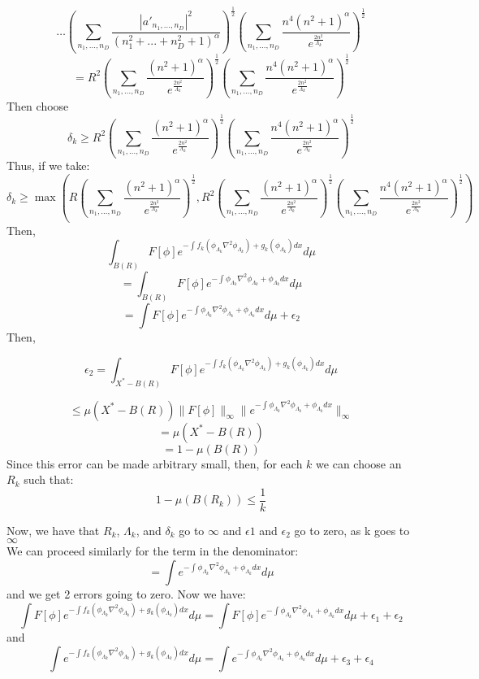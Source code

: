 \documentclass{article}
\theoremstyle{definition}
\begin{document}
\[
\ldots \left(\sum_{n_1,..., n_D} \frac{\left|{a'_{n_1,..., n_D}}\right|^2}{(n_1^2 +...+ n_D^2 + 1)^{\alpha}} \right)^{\frac{1}{2}} \left( \sum_{n_1,\ldots,n_D}\frac{n^4(n^2+1)^\alpha}{e^{\frac{2n^2}{\Lambda_k}}} \right)^{\frac{1}{2}}
\]
\[
=R^2 \left( \sum_{n_1,\ldots,n_D}\frac{(n^2+1)^\alpha}{e^{\frac{2n^2}{\Lambda_k}}} \right)^{\frac{1}{2}} \left( \sum_{n_1,\ldots,n_D}\frac{n^4(n^2+1)^\alpha}{e^{\frac{2n^2}{\Lambda_k}}} \right)^{\frac{1}{2}}
\]
Then choose
\[
\delta_k \geq R^2 \left( \sum_{n_1,\ldots,n_D}\frac{(n^2+1)^\alpha}{e^{\frac{2n^2}{\Lambda_k}}} \right)^{\frac{1}{2}} \left( \sum_{n_1,\ldots,n_D}\frac{n^4(n^2+1)^\alpha}{e^{\frac{2n^2}{\Lambda_k}}} \right)^{\frac{1}{2}}
\]
Thus, if we take:
\[
\delta_k \geq \max\left(R\left( \sum_{n_1,\ldots,n_D}\frac{(n^2+1)^\alpha}{e^{\frac{2n^2}{\Lambda_k}}} \right)^{\frac{1}{2}}, R^2 \left( \sum_{n_1,\ldots,n_D}\frac{(n^2+1)^\alpha}{e^{\frac{2n^2}{\Lambda_k}}} \right)^{\frac{1}{2}} \left( \sum_{n_1,\ldots,n_D}\frac{n^4(n^2+1)^\alpha}{e^{\frac{2n^2}{\Lambda_k}}} \right)^{\frac{1}{2}}\right)
\]
Then,
\[
\int_{B(R)} F[\phi]e^{-\int f_k\left(\phi_{\Lambda_k} \nabla^2 \phi_{\Lambda_k}\right) + g_k\left(\phi_{\Lambda_k}\right) dx}d\mu
\]
\[
=\int_{B(R)} F[\phi]e^{-\int \phi_{\Lambda_k} \nabla^2 \phi_{\Lambda_k} + \phi_{\Lambda_k} dx}d\mu
\]
\[
=\int F[\phi]e^{-\int \phi_{\Lambda_k} \nabla^2 \phi_{\Lambda_k} + \phi_{\Lambda_k} dx}d\mu + \epsilon_2
\]
Then,

\[
\epsilon_2 = \int_{X^*-B(R)} F[\phi]e^{-\int f_k\left(\phi_{\Lambda_k} \nabla^2 \phi_{\Lambda_k}\right) + g_k\left(\phi_{\Lambda_k}\right) dx}d\mu
\]

\[
\leq \mu(X^*-B(R)) \|F[\phi]\|_\infty \|e^{-\int \phi_{\Lambda_k} \nabla^2 \phi_{\Lambda_k} + \phi_{\Lambda_k} dx}\|_\infty
\]
\[
=\mu(X^*-B(R))
\]
\[
=1-\mu(B(R))
\]
Since this error can be made arbitrary small, then, for each $k$ we can choose an $R_k$ such that:
\[
1-\mu(B(R_k)) \leq \frac{1}{k}
\]

Now, we have that $R_k$, $\Lambda_k$, and $\delta_k$ go to $\infty$ and $\epsilon1$ and $\epsilon_2$ go to zero, as k goes to $\infty$\\
We can proceed similarly for the term in the denominator: 
\[
=\int e^{-\int \phi_{\Lambda_k} \nabla^2 \phi_{\Lambda_k} + \phi_{\Lambda_k} dx}d\mu
\]
and we get 2 errors going to zero. Now we have:
\[
\int F[\phi]e^{-\int f_k\left(\phi_{\Lambda_k} \nabla^2 \phi_{\Lambda_k}\right) + g_k\left(\phi_{\Lambda_k}\right) dx}d\mu =\int F[\phi]e^{-\int \phi_{\Lambda_k} \nabla^2 \phi_{\Lambda_k} + \phi_{\Lambda_k} dx}d\mu + \epsilon_1 +\epsilon_2
\]
and 
\[
\int e^{-\int f_k\left(\phi_{\Lambda_k} \nabla^2 \phi_{\Lambda_k}\right) + g_k\left(\phi_{\Lambda_k}\right) dx}d\mu =\int e^{-\int \phi_{\Lambda_k} \nabla^2 \phi_{\Lambda_k} + \phi_{\Lambda_k} dx}d\mu + \epsilon_3 +\epsilon_4
\]
\end{document}
